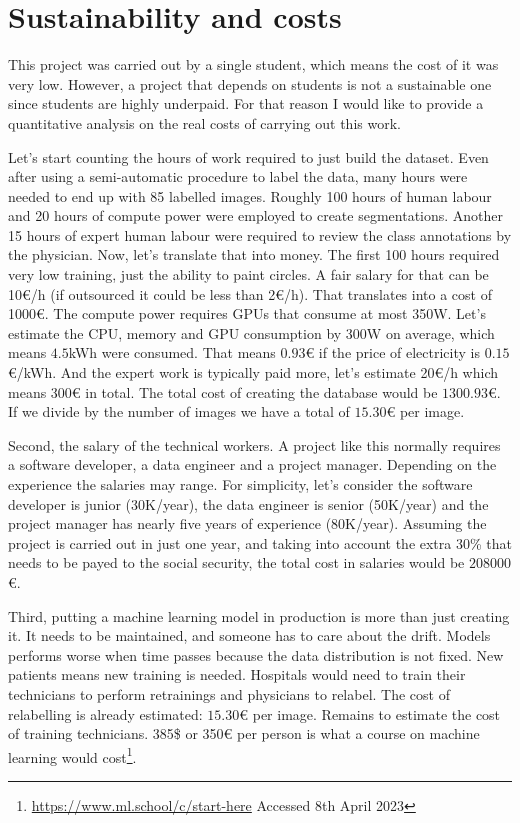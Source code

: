 \appendix
\chapter{Sustainability and costs}

This project was carried out by a single student, which means the cost of it was very low. However, a project that depends on students is not a sustainable one since students are highly underpaid. For that reason I would like to provide a quantitative analysis on the real costs of carrying out this work. 

Let's start counting the hours of work required to just build the dataset. Even after using a semi-automatic procedure to label the data, many hours were needed to end up with 85 labelled images. Roughly 100 hours of human labour and 20 hours of compute power were employed to create segmentations. Another 15 hours of expert human labour were required to review the class annotations by the physician. Now, let's translate that into money. The first 100 hours required very low training, just the ability to paint circles. A fair salary for that can be 10€/h (if outsourced it could be less than 2€/h). That translates into a cost of 1000€. The compute power requires GPUs that consume at most 350W. Let's estimate the CPU, memory and GPU consumption by 300W on average, which means $4.5$kWh were consumed. That means $0.93$€ if the price of electricity is $0.15$€/kWh. And the expert work is typically paid more, let's estimate 20€/h which means 300€ in total. The total cost of creating the database would be $1300.93$€. If we divide by the number of images we have a total of $15.30$€ per image. 

Second, the salary of the technical workers. A project like this normally requires a software developer, a data engineer and a project manager. Depending on the experience the salaries may range. For simplicity, let's consider the software developer is junior (30K/year), the data engineer is senior (50K/year) and the project manager has nearly five years of experience (80K/year). Assuming the project is carried out in just one year, and taking into account the extra 30\% that needs to be payed to the social security, the total cost in salaries would be $208000$€.

Third, putting a machine learning model in production is more than just creating it. It needs to be maintained, and someone has to care about the drift. Models performs worse when time passes because the data distribution is not fixed. New patients means new training is needed. Hospitals would need to train their technicians to perform retrainings and physicians to relabel. The cost of relabelling is already estimated: $15.30$€ per image. Remains to estimate the cost of training technicians. 385\$ or 350€ per person is what a course on machine learning would cost\footnote{\url{https://www.ml.school/c/start-here} Accessed 8th April 2023}.

